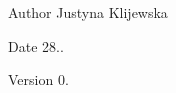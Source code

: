 \begin{DoxyAuthor}{Author}
Justyna Klijewska 
\end{DoxyAuthor}
\begin{DoxyDate}{Date}
28.. 
\end{DoxyDate}
\begin{DoxyVersion}{Version}
0. 
\end{DoxyVersion}
